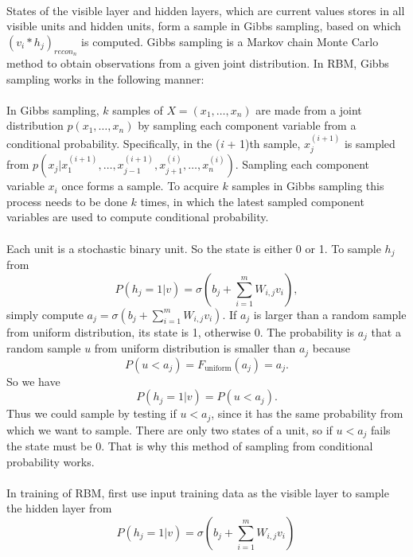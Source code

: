 \documentclass[12pt]{article}
\begin{document}
\\
States of the visible layer and hidden layers, which are current values stores in all visible units and hidden units, form a sample in Gibbs sampling, based on which $(v_i * h_j)_{recon_n}$ is computed. Gibbs sampling is a Markov chain Monte Carlo method to obtain observations from a given joint distribution. In RBM, Gibbs sampling works in the following manner:\\
\\
In Gibbs sampling, $k$ samples of $X = (x_1, \dots, x_n)$ are made from   a joint distribution $\left.p(x_1, \dots, x_n)\right.$ by sampling each component variable from a conditional probability. Specifically, in the (\emph{i} + 1)th sample, $x_j^{(i+1)}$ is sampled from $p(x_j|x_1^{(i+1)},\dots,x_{j-1}^{(i+1)},x_{j+1}^{(i)},\dots,x_n^{(i)})$. Sampling each component variable $x_i$ once forms a sample.  To acquire $k$ samples in Gibbs sampling this process needs to be done $k$ times, in which the latest sampled component variables are used to compute conditional probability.\\
\\
Each unit is a stochastic binary unit. So the state is either 0 or 1. To sample $h_j$ from \begin{equation}
P(h_j=1|v) = \sigma \left(b_j + \sum_{i=1}^m W_{i,j} v_i \right),
\end{equation}
simply compute $a_j = \sigma \left(b_j + \sum_{i=1}^m W_{i,j} v_i \right)$. If $a_j$ is larger than a random sample from uniform distribution, its state is 1, otherwise 0. The probability is $a_j$ that a random sample $u$ from uniform distribution is smaller than $a_j$ because \begin{equation}
P(u < a_j) = F_{\text{uniform}}(a_j) = a_j.
\end{equation}
So we have \begin{equation}
P(h_j=1|v) = P(u < a_j).
\end{equation}
Thus we could sample by testing if $u < a_j$, since it has the same probability from which we want to sample. There are only two states of a unit, so if $u < a_j$ fails the state must be 0. That is why this method of sampling from conditional probability works.\\
\\
In training of RBM, first use input training data as the visible layer to sample the hidden layer from \begin{equation}
P(h_j=1|v) = \sigma \left(b_j + \sum_{i=1}^m W_{i,j} v_i \right)\,
\end{equation}
\end{document}

